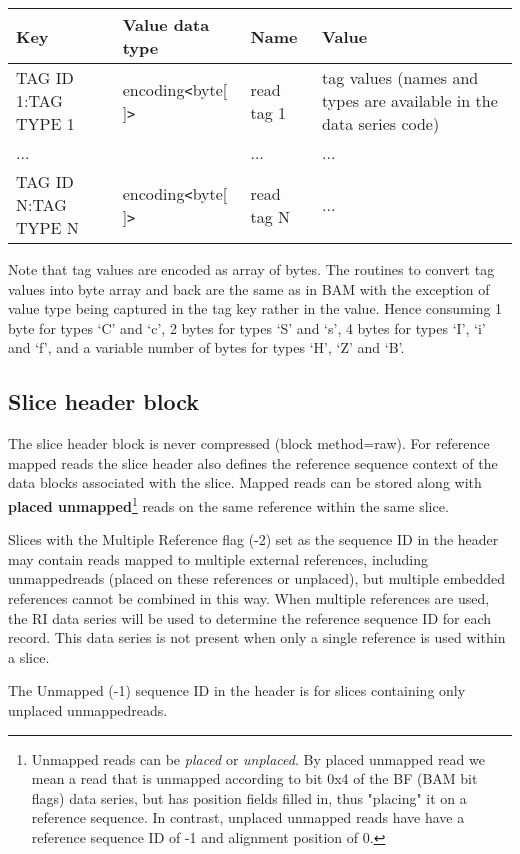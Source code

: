\documentclass[a4paper]{article}
\begin{document}
\begin{tabular}{|l|l|l|>{\raggedright}p{160pt}|}
\hline
\textbf{Key} & \textbf{Value data type} & \textbf{Name} & \textbf{Value}
\tabularnewline
\hline
TAG ID 1:TAG TYPE 1 & encoding\texttt{<}byte[ ]\texttt{>} & read tag 1 & tag values
(names and types are available in the data series code)\tabularnewline
\hline
... &  & ... & ...\tabularnewline
\hline
TAG ID N:TAG TYPE N & encoding\texttt{<}byte[ ]\texttt{>} & read tag N & ...\tabularnewline
\hline
\end{tabular}

Note that tag values are encoded as array of bytes. The routines to convert tag 
values into byte array and back are the same as in BAM with the exception of value 
type being captured in the tag key rather in the value.
Hence consuming 1 byte for types `C' and `c', 2 bytes for types `S' and `s', 4 bytes for types `I', `i' and `f', and a variable number of bytes for types `H', `Z' and `B'.

\subsection{\textbf{Slice header block}}

The slice header block is never compressed (block method=raw). For reference mapped 
reads the slice header also defines the reference sequence context of the data 
blocks associated with the slice. Mapped reads can be stored along with
\textbf{placed unmapped}\footnote{Unmapped reads can be \textit{placed} or \textit{unplaced}.
By placed unmapped read we mean a read that is unmapped according to bit 0x4 of the
BF (BAM bit flags) data series, but has position fields filled in, thus "placing"  it on a reference sequence. In contrast,
unplaced unmapped reads have have a reference sequence ID of -1 and alignment position of 0.}
reads on the same reference within the same slice.

Slices with the Multiple Reference flag (-2) set as the sequence ID in the header may contain reads
mapped to multiple external references, including unmapped\footnotemark[\value{footnote}] reads (placed on these references or unplaced),
but multiple embedded references cannot be combined in this way.  When multiple references are
used, the RI data series will be used to determine the reference sequence ID for each record.  This
data series is not present when only a single reference is used within a slice.

The Unmapped (-1) sequence ID in the header is for slices containing only unplaced
unmapped\footnotemark[\value{footnote}] reads.
\end{document}
